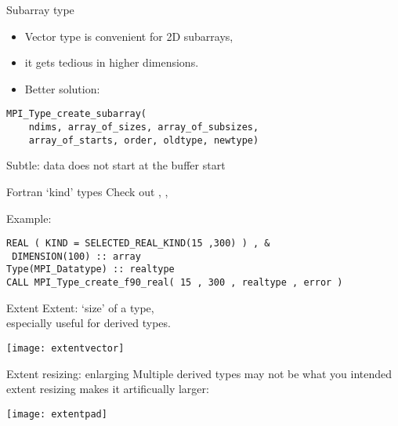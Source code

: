\begin{numberedframe}{Subarray type}
  \begin{itemize}
  \item Vector type is convenient for 2D subarrays,
  \item it gets tedious in higher dimensions.
  \item Better solution: 
  \end{itemize}
\begin{lstlisting}
MPI_Type_create_subarray(
    ndims, array_of_sizes, array_of_subsizes,
    array_of_starts, order, oldtype, newtype)  
\end{lstlisting}
Subtle: data does not start at the buffer start
\end{numberedframe}

\begin{exerciseframe}[cubegather]
  
\end{exerciseframe}

\begin{fortran}
\begin{numberedframe}{Fortran `kind' types}
  Check out
,
,

Example:
\lstset{language=Fortran}
\begin{lstlisting}
REAL ( KIND = SELECTED_REAL_KIND(15 ,300) ) , &
 DIMENSION(100) :: array
Type(MPI_Datatype) :: realtype
CALL MPI_Type_create_f90_real( 15 , 300 , realtype , error )
\end{lstlisting}
\end{numberedframe}
\end{fortran}


\begin{numberedframe}{Extent}
  Extent: `size' of a type,\\
  especially useful for derived types.

  \texttt{[image: extentvector]}
\end{numberedframe}

\begin{numberedframe}{Extent resizing: enlarging}
  Multiple derived types may not be what you intended\\
  extent resizing makes it artificually larger:

  \texttt{[image: extentpad]}  
\end{numberedframe}

